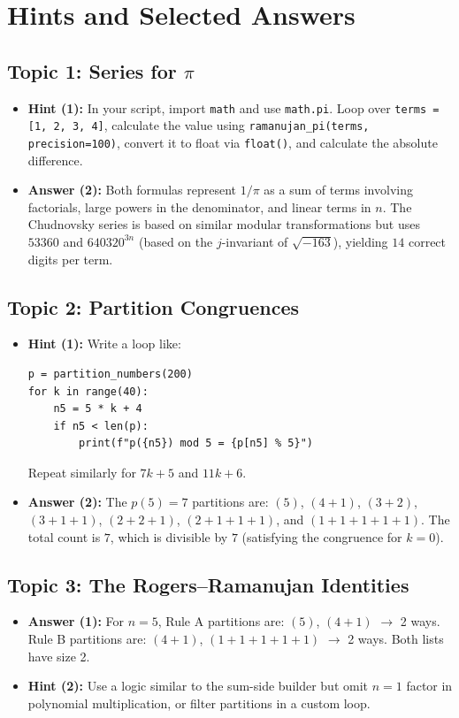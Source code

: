 \documentclass[11pt]{article}
\begin{document}
\section{Hints and Selected Answers}

\subsection{Topic 1: Series for $\pi$}
\begin{itemize}
    \item \textbf{Hint (1):} In your script, import \texttt{math} and use \texttt{math.pi}. Loop over \texttt{terms = [1, 2, 3, 4]}, calculate the value using \texttt{ramanujan\_pi(terms, precision=100)}, convert it to float via \texttt{float()}, and calculate the absolute difference.
    \item \textbf{Answer (2):} Both formulas represent $1/\pi$ as a sum of terms involving factorials, large powers in the denominator, and linear terms in $n$. The Chudnovsky series is based on similar modular transformations but uses $53360$ and $640320^{3n}$ (based on the $j$-invariant of $\sqrt{-163}$), yielding $14$ correct digits per term.
\end{itemize}

\subsection{Topic 2: Partition Congruences}
\begin{itemize}
    \item \textbf{Hint (1):} Write a loop like:
    \begin{lstlisting}
p = partition_numbers(200)
for k in range(40):
    n5 = 5 * k + 4
    if n5 < len(p):
        print(f"p({n5}) mod 5 = {p[n5] % 5}")
    \end{lstlisting}
    Repeat similarly for $7k+5$ and $11k+6$.
    \item \textbf{Answer (2):} The $p(5) = 7$ partitions are: $(5)$, $(4+1)$, $(3+2)$, $(3+1+1)$, $(2+2+1)$, $(2+1+1+1)$, and $(1+1+1+1+1)$. The total count is $7$, which is divisible by $7$ (satisfying the congruence for $k=0$).
\end{itemize}

\subsection{Topic 3: The Rogers--Ramanujan Identities}
\begin{itemize}
    \item \textbf{Answer (1):} For $n=5$, Rule A partitions are: $(5)$, $(4+1)$ $\to$ 2 ways. Rule B partitions are: $(4+1)$, $(1+1+1+1+1)$ $\to$ 2 ways. Both lists have size 2.
    \item \textbf{Hint (2):} Use a logic similar to the sum-side builder but omit $n=1$ factor in polynomial multiplication, or filter partitions in a custom loop.
\end{itemize}
\end{document}
